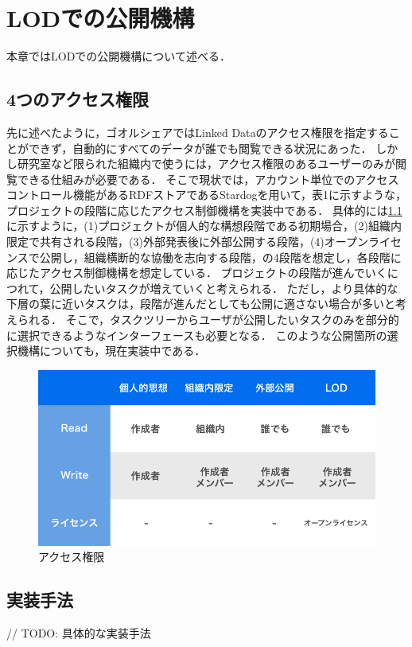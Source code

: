\chapter{LODでの公開機構}
本章ではLODでの公開機構について述べる．

\section{4つのアクセス権限}
先に述べたように，ゴオルシェアではLinked Dataのアクセス権限を指定することができず，自動的にすべてのデータが誰でも閲覧できる状況にあった．
しかし研究室など限られた組織内で使うには，アクセス権限のあるユーザーのみが閲覧できる仕組みが必要である．
そこで現状では，アカウント単位でのアクセスコントロール機能があるRDFストアであるStardogを用いて，表1に示すような，プロジェクトの段階に応じたアクセス制御機構を実装中である．
具体的には\ref{img:permission_table}に示すように，(1)プロジェクトが個人的な構想段階である初期場合，(2)組織内限定で共有される段階，(3)外部発表後に外部公開する段階，(4)オープンライセンスで公開し，組織横断的な協働を志向する段階，の4段階を想定し，各段階に応じたアクセス制御機構を想定している．
プロジェクトの段階が進んでいくにつれて，公開したいタスクが増えていくと考えられる．
ただし，より具体的な下層の葉に近いタスクは，段階が進んだとしても公開に適さない場合が多いと考えられる．
そこで，タスクツリーからユーザが公開したいタスクのみを部分的に選択できるようなインターフェースも必要となる．
このような公開箇所の選択機構についても，現在実装中である．

\begin{figure}[t]
	\begin{center}
		\includegraphics[width=0.9\linewidth]{assets/img/permission_table.png}
		\caption{アクセス権限}
		\label{img:permission_table}
	\end{center}
\end{figure}

\section{実装手法}
// TODO: 具体的な実装手法
